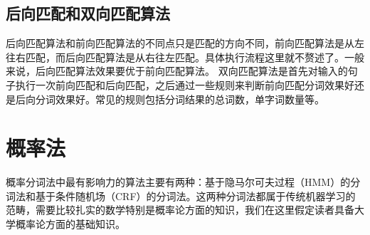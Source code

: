 \documentclass[twoside,a4paper,12pt]{book}%
\begin{document}
\subsection{后向匹配和双向匹配算法}
后向匹配算法和前向匹配算法的不同点只是匹配的方向不同，前向匹配算法是从左往右匹配，而后向匹配算法是从右往左匹配。具体执行流程这里就不赘述了。一般来说，后向匹配算法效果要优于前向匹配算法。
双向匹配算法是首先对输入的句子执行一次前向匹配和后向匹配，之后通过一些规则来判断前向匹配分词效果好还是后向分词效果好。常见的规则包括分词结果的总词数，单字词数量等。

\section{概率法}
概率分词法中最有影响力的算法主要有两种：基于隐马尔可夫过程（\gls{HMM}）的分词法和基于条件随机场（\gls{CRF}）的分词法。这两种分词法都属于传统机器学习的范畴，需要比较扎实的数学特别是概率论方面的知识，我们在这里假定读者具备大学概率论方面的基础知识。
\end{document}
